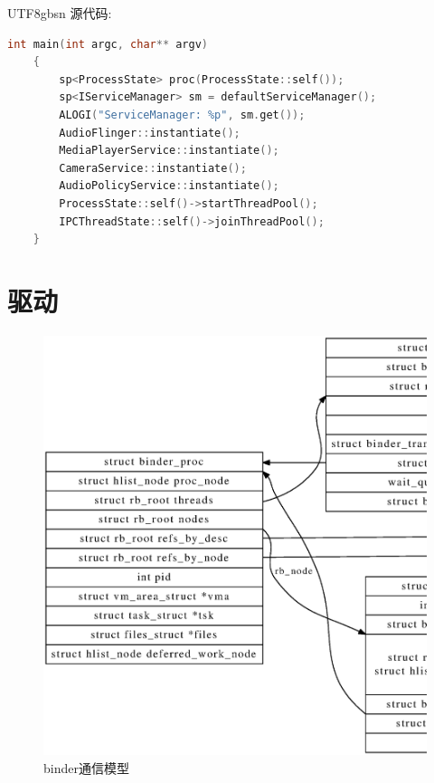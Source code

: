 \documentclass[a4paper,11pt]{article}
\begin{document}
\begin{CJK*}{UTF8}{gbsn}
    源代码:\\
    \begin{lstlisting}[language=C++]
    int main(int argc, char** argv)
    {
        sp<ProcessState> proc(ProcessState::self());
        sp<IServiceManager> sm = defaultServiceManager();
        ALOGI("ServiceManager: %p", sm.get());
        AudioFlinger::instantiate();
        MediaPlayerService::instantiate();
        CameraService::instantiate();                                                                                                                                                             
        AudioPolicyService::instantiate();
        ProcessState::self()->startThreadPool();
        IPCThreadState::self()->joinThreadPool();
    }
    \end{lstlisting}




\section{驱动}
    \begin{figure}[h!]
    \centering
    \includegraphics[keepaspectratio=true, scale=0.4]{dot/driver_data_structure.ps}
    \caption{binder通信模型}
    \end{figure}



\end{CJK*}
\end{document}
